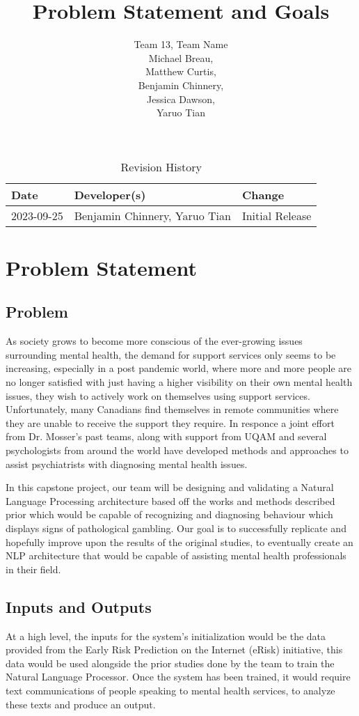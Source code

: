 \documentclass{article}
\title{Problem Statement and Goals\\\progname}
\author{Team 13, Team Name 
\\Michael Breau, \\Matthew Curtis, \\Benjamin Chinnery, \\Jessica Dawson, \\Yaruo Tian}
\date{}
\begin{document}
\maketitle

\begin{table}[hp]
\caption{Revision History} \label{TblRevisionHistory}
\begin{tabularx}{\textwidth}{llX}
\toprule
\textbf{Date} & \textbf{Developer(s)} & \textbf{Change}\\
\midrule
2023-09-25 &  Benjamin Chinnery, Yaruo Tian & Initial Release\\
\bottomrule
\end{tabularx}
\end{table}

\section{Problem Statement}

\subsection{Problem}
As society grows to become more conscious of the ever-growing issues surrounding mental health, the demand for support services only seems to be increasing, especially in a post pandemic world, where more and more people are no longer satisfied with just having a higher visibility on their own mental health issues, they wish to actively work on themselves using support services. Unfortunately, many Canadians find themselves in remote communities where they are unable to receive the support they require. In responce a joint effort from Dr. Mosser's past teams, along with support from UQAM and several psychologists from around the world have developed methods and approaches to assist psychiatrists with diagnosing mental health issues.

In this capstone project, our team will be designing and validating a Natural Language Processing architecture based off the works and methods described prior which would be capable of recognizing and diagnosing behaviour which displays signs of pathological gambling. Our goal is to successfully replicate and hopefully improve upon the results of the original studies, to eventually create an NLP architecture that would be capable of assisting mental health professionals in their field.

\subsection{Inputs and Outputs}
At a high level, the inputs for the system's initialization would be the data provided from the Early Risk Prediction on the Internet (eRisk) initiative, this data would be used alongside the prior studies done by the team to train the Natural Language Processor. Once the system has been trained, it would require text communications of people speaking to mental health services, to analyze these texts and produce an output.
\end{document}
